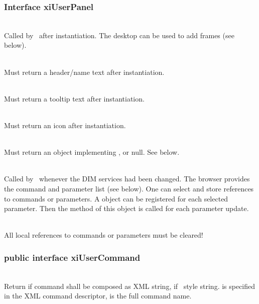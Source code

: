 \subsubsection{Interface xiUserPanel}
\bcir
\item {}\\
Called by \gui\ after instantiation. The desktop can be used to add frames (see below).\\
\item {}\\
Must return a header/name text after instantiation.\\
\item {}\\
Must return a tooltip text after instantiation.\\
\item {}\\
Must return an icon after instantiation.\\
\item {}\\
Must return an object implementing , or null. See below.\\
\item {}\\
Called by \gui\ whenever the DIM services had been changed.
The browser provides the command and parameter list (see below). 
One can select and store references to commands or parameters. 
A  object can be registered for each selected parameter. 
Then the  method of this object is called for each parameter update.\\
\item {}\\
All local references to commands or parameters must be cleared!
\ecir
\subsubsection{public interface xiUserCommand}
\bcir
\item {}\\
Return  if command shall be composed as XML string, 
 if \mbs\ style string.  
is specified in the XML command descriptor,  is the full command name.
\ecir

